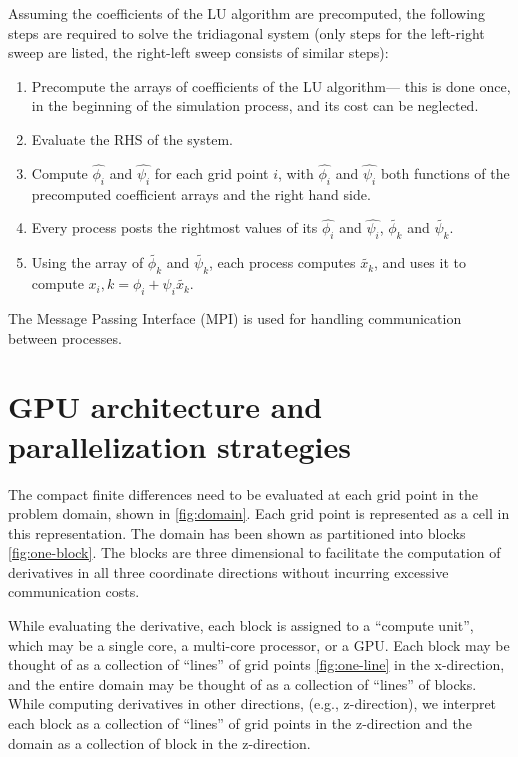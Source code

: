 \documentclass{article}
\begin{document}
    Assuming the coefficients of the LU algorithm are precomputed,
    the following steps are required to solve the tridiagonal system
    (only steps for the left-right sweep are listed, the right-left sweep
    consists of similar steps):

    \begin{enumerate}
    \item Precompute the arrays of coefficients of the LU algorithm---
    this is done once, in the beginning of the simulation process, and its cost
    can be neglected.
    \item Evaluate the RHS of the system.
    \item Compute $\hat{\phi_i}$ and $\hat{\psi_i}$ for each grid point $i$,
    with $\hat{\phi_i}$ and $\hat{\psi_i}$ both functions of the precomputed
    coefficient arrays and the right hand side.
    \item Every process posts the rightmost values of its $\hat{\phi_i}$ and $\hat{\psi_i}$,
        $\widetilde{\phi_k}$ and $\widetilde{\psi_k}$.
    \item Using the array of $\widetilde{\phi_k}$ and $\widetilde{\psi_k}$,
        each process computes $\widetilde{x_k}$, and uses it to compute
        $x_i,k = \phi_i + \psi_i\widetilde{x_k}$.
    \end{enumerate}

    The Message Passing Interface (MPI) is used for handling communication
    between processes.

\section{GPU architecture and parallelization strategies}

    The compact finite differences need to be evaluated
    at each grid point in the problem domain,
    shown in \ref{fig:domain}.
    Each grid point is represented as a cell in this representation.
    The domain has been shown as partitioned into blocks \ref{fig:one-block}.
    The blocks are three dimensional to facilitate
    the computation of derivatives in all three coordinate directions
    without incurring excessive communication costs.

    While evaluating the derivative, each block is assigned to a ``compute unit'',
    which may be a single core, a multi-core processor, or a GPU.
    Each block may be thought of as a collection of ``lines'' of grid points
    \ref{fig:one-line} in the x-direction,
    and the entire domain may be thought of as a collection of ``lines'' of
    blocks.
    While computing derivatives in other directions,
    (e.g., z-direction), we interpret each block as a collection of ``lines''
    of grid points in the z-direction and the domain as a collection of
    block in the z-direction.
\end{document}
